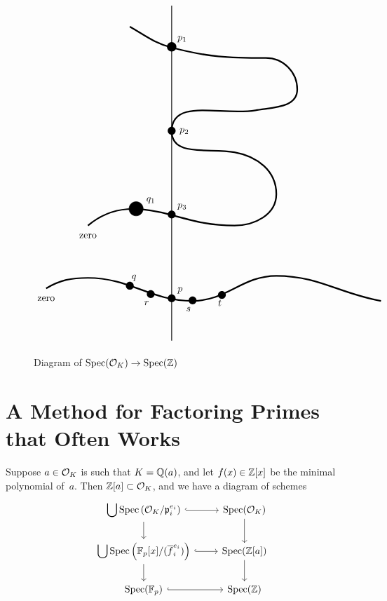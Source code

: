 \begin{figure}
\centering
$$
\begin{tikzpicture}[scale = 1.5]

\draw[thick] (0, 0) to (0, 8);

\node at (-3, 1) {zero};

\node at (0, 1) {\huge $\bullet$};
\node at (.2, 1.2) {$p$};

\node at (-1, 1.3) {\huge $\bullet$};
\node at (-.9, 1.5) {$q$};

\node at (-2, 2.5) {zero};

\draw [fill] (-.85, 3.15) circle [radius = .17];
\node at (-.5, 3.35) {$q_1$};

\node at (-.5, 1.1) {\huge $\bullet$};
\node at (-.6, .9) {$r$};

\node at (.5, .95) {\huge $\bullet$};
\node at (.4, .75) {$s$};

\node at (1.2, 1.08) {\huge $\bullet$};
\node at (1.15, .9) {$t$};

\node at (0, 3) {\huge $\bullet$};
\node at (.25, 3.2) {$p_3$};

\node at (0, 5) {\huge $\bullet$};
\node at (.3, 5) {$p_2$};

\node at (0, 7) {\Huge $\bullet$};
\node at (.25, 7.2) {$p_1$};

\draw[ultra thick] (-3, 1.25) to [out = 30, in = 180] (-2, 1.5) to [out = 0, in = 180] (.5, .95) to [out = 0, in = 180] (2.5, 1.55) to [out = 0, in = 170] (5, .95);

\draw[ultra thick] (-2, 2.75) to [out = 40, in = 165] (0, 3) to [out = -15, in = 180] (1.5, 2.75) to [out = 0, in = -90] (2.5, 3.5) to [out = 90, in = -10] (1.5, 4.5) to [out = 170, in = -90] (0, 5) to [out = 90, in = 190] (2, 5.5) to [out = 10, in = -90] (3, 6) to [out = 90, in = 0] (2.25, 6.75) to [out = 180, in = -15] (0, 7) to [out = 165, in = -30] (-1, 7.5);

\end{tikzpicture}
$$
\caption{Diagram of $\Spec(\sO_K) \rightarrow \Spec(\ZZ)$}
\label{fig:O_KoverSpecZ}
\end{figure}


\section{A Method for Factoring Primes that Often Works}

Suppose $a\in\mathcal{O}_K$ is such that $K=\mathbb{Q}(a)$, and let $f(x) \in \mathbb{Z}[x]$
be the minimal polynomial of~$a$. Then $\mathbb{Z}[a]\subset \mathcal{O}_K$, and
we have a diagram of schemes
$$
  \begin{tikzcd}
    \displaystyle\bigcup\Spec\left(\sO_K/\p_i^{e_i}\right) \ar[r,hook] \ar[d] & \Spec(\sO_K) \ar[d]
    \\
    \displaystyle\bigcup\Spec\left(\FF_p[x]/(\overline{f}_i^{e_i})\right) \ar[r,hook] \ar[d] & \Spec(\ZZ[a]) \ar[d]
    \\
    \Spec(\FF_p) \ar[r,hook] & \Spec(\ZZ)
  \end{tikzcd}
$$

